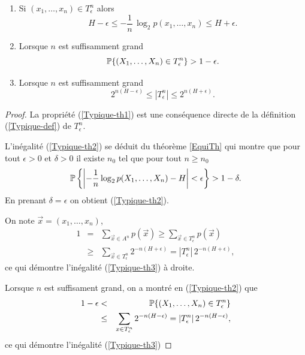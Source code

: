 \begin{proposition} 
\begin{enumerate}[label=(\roman*)]
\item  Si $(x_1, \dots , x_n) \in T^n_\epsilon$ alors
\begin{equation}
\label{Typique-th1}
H - \epsilon \leq - \frac 1 n \,\log_2 p(x_1, \dots , x_n)  \leq H + \epsilon .
\end{equation}
\item Lorsque $n$ est suffisamment grand
\begin{equation}
\label{Typique-th2}
\mathbb{P} \{(X_1, \dots,X_n) \in T^n_\epsilon \} > 1 - \epsilon .
\end{equation}
\item  Lorsque $n$ est suffisamment grand
\begin{equation}
\label{Typique-th3}
2^{n(H - \epsilon)} \leq |T^n_\epsilon| \leq
2^{n(H + \epsilon)} .
\end{equation}
\end{enumerate}
\end{proposition}
\begin{proof}
La propri\'et\'e (\ref{Typique-th1}) est une
cons\'equence directe de la d\'efinition (\ref{Typique-def})
de $T^n_\epsilon$.

L'in\'egalit\'e (\ref{Typique-th2})
se d\'eduit du th\'eor\`eme \ref{EquiTh} qui montre
que pour tout $\epsilon>0$ et $\delta > 0$ il existe $n_0$
tel que pour tout $n \geq n_0$
\[
\mathbb{P} \left\{\left|  -\frac 1 n \log_2 p(X_1, \dots , X_n) - H \right|
< \epsilon \right\} >
1 - \delta .
\]
En prenant $\delta = \epsilon$ on obtient (\ref{Typique-th2}).

On note $\vec x = (x_1 , \dots , x_n)$,
\begin{eqnarray*}
1 &=& \sum_{\vec x \in A^n} p(\vec x) \geq \sum_{\vec x \in T^n_\epsilon} p(\vec x) \\
& \geq & \sum_{\vec x \in T^n_\epsilon} 2^{-n(H +\epsilon)} =
|T^n_\epsilon|\, 2^{-n(H +\epsilon)} ,
\end{eqnarray*}
ce qui d\'emontre l'in\'egalit\'e (\ref{Typique-th3})
\`a droite.

Lorsque $n$ est suffisament grand, on a montr\'e en
(\ref{Typique-th2}) que
\begin{eqnarray*}
1 - \epsilon & < &\mathbb{P} \{(X_1, \dots,X_n) \in T^n_\epsilon \} \\
& \leq & \sum_{x \in T^n_\epsilon} 2^{-n(H-\epsilon)} =
|T^n_\epsilon| \, 2^{-n(H-\epsilon)} ,
\end{eqnarray*}
ce qui d\'emontre l'in\'egalit\'e (\ref{Typique-th3})
\end{proof}

